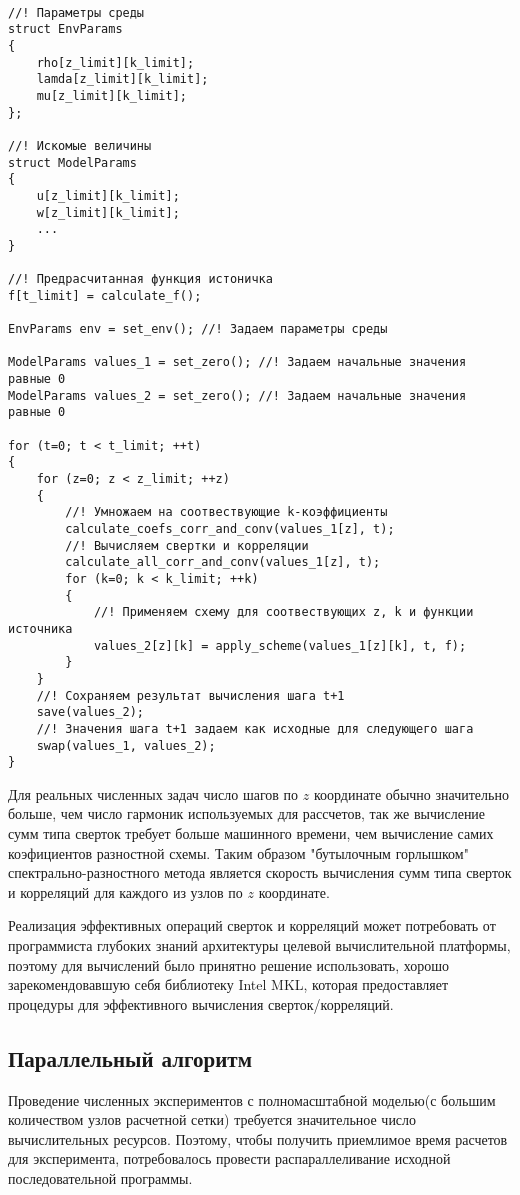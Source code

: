 \begin{lstlisting}

//! Параметры среды
struct EnvParams
{
	rho[z_limit][k_limit];
	lamda[z_limit][k_limit];
	mu[z_limit][k_limit];
};

//! Искомые величины
struct ModelParams
{
	u[z_limit][k_limit];
	w[z_limit][k_limit];
	... 
}

//! Предрасчитанная функция истоничка
f[t_limit] = calculate_f();

EnvParams env = set_env(); //! Задаем параметры среды

ModelParams values_1 = set_zero(); //! Задаем начальные значения равные 0
ModelParams values_2 = set_zero(); //! Задаем начальные значения равные 0

for (t=0; t < t_limit; ++t)
{
	for (z=0; z < z_limit; ++z)
	{
		//! Умножаем на соотвествующие k-коэффициенты
		calculate_coefs_corr_and_conv(values_1[z], t);
		//! Вычисляем свертки и корреляции
		calculate_all_corr_and_conv(values_1[z], t);
		for (k=0; k < k_limit; ++k)
		{
			//! Применяем схему для соотвествующих z, k и функции источника
			values_2[z][k] = apply_scheme(values_1[z][k], t, f);
		}
	}
	//! Сохраняем результат вычисления шага t+1
	save(values_2);
	//! Значения шага t+1 задаем как исходные для следующего шага
	swap(values_1, values_2);
}

\end{lstlisting}

Для реальных численных задач число шагов по $z$ координате обычно значительно больше, чем число гармоник используемых для рассчетов,
так же вычисление сумм типа сверток требует больше машинного времени, чем вычисление самих коэфициентов разностной схемы.
Таким образом "бутылочным горлышком" спектрально-разностного метода является скорость вычисления сумм типа сверток и корреляций для
каждого из узлов по $z$ координате.

Реализация эффективных операций сверток и корреляций может потребовать от программиста глубоких знаний архитектуры 
целевой вычислительной платформы, поэтому для вычислений было принятно решение использовать,
хорошо зарекомендовавшую себя библиотеку Intel MKL, которая предоставляет процедуры для эффективного вычисления сверток/корреляций.

\subsection{Параллельный алгоритм}
Проведение численных экспериментов с полномасштабной моделью(с большим количеством узлов расчетной сетки)
требуется значительное число вычислительных ресурсов. Поэтому, чтобы получить приемлимое время расчетов для эксперимента,
потребовалось провести распараллеливание исходной последовательной программы.

